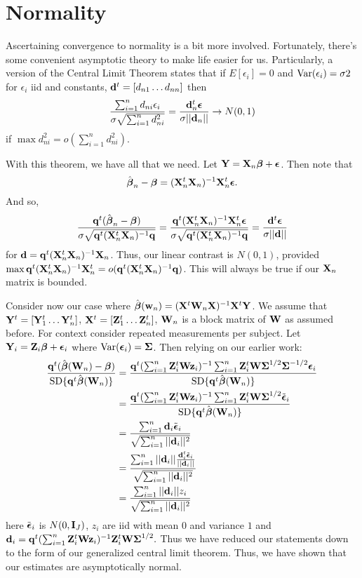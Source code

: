 \section{Normality}
Ascertaining convergence to normality is a bit more involved.
Fortunately, there's some convenient asymptotic theory to 
make life easier for us. Particularly, a version of the
Central Limit Theorem states that if $E[\epsilon_i] = 0$ and
$\mbox{Var}(\epsilon_i) = \sigma2$ for $\epsilon_i$ iid and constants, $\mathbf{d}^t
= [d_{n1} \ldots d_{nn}]$ then
$$
\frac{\sum_{i=1}^n d_{ni} \epsilon_i}{\sigma \sqrt{\sum_{i=1}^n d_{ni}^2 }}
=  \frac{ \mathbf{d}_n ^ t \boldsymbol{\epsilon} }{\sigma|| \mathbf{d}_n ||} \rightarrow N(0, 1)
$$
if $\max d_{ni}^2 = o(\sum_{i=1}^n d_{ni}^2)$.

With this theorem, we have all that we need. Let
$\mathbf{Y} = \mathbf{X}_n \boldsymbol{\beta} + \boldsymbol{\epsilon}$. Then note that
$$
\hat {\boldsymbol{\beta}}_n  - \boldsymbol{\beta} 
= (\mathbf{X}_n^t \mathbf{X}_n)^{-1} \mathbf{X}_n^t \boldsymbol{\epsilon}. 
$$
And so,
$$
\frac{\bq^t(\hat \bbeta_n  - \bbeta)}{\sigma \sqrt{\bq^t (\bX_n^t \bX_n)^{-1} \bq}}=
\frac{\bq^t (\bX_n^t \bX_n)^{-1} \bX_n^t \beps}%
{\sigma \sqrt{\bq^t (\bX_n^t \bX_n)^{-1} \bq}}
= \frac{\bd^t \beps}{\sigma ||\bd||}
$$
for $\mathbf{d} = \mathbf{q}^t (\mathbf{X}_n^t \mathbf{X}_n)^{-1}\mathbf{X}_n$. Thus, our linear contrast
is $N(0,1)$, provided $\max \mathbf{q}^t (\mathbf{X}_n^t \mathbf{X}_n)^{-1}\mathbf{X}_n^t = o(\mathbf{q}^t (\mathbf{X}_n^t \mathbf{X}_n)^{-1} \mathbf{q})$.
This will always be true if our $\mathbf{X}_n$ matrix is bounded.

Consider now our case where $\hat {\boldsymbol{\beta}} (\mathbf{w}_n) = (\mathbf{X}^t \mathbf{W}_n \mathbf{X})^{-1} \mathbf{X}^t \mathbf{Y}$. We
assume that $\mathbf{Y}^t = [\mathbf{Y}_1^t \ldots \mathbf{Y}_n^t]$, $\mathbf{X}^t = [\mathbf{Z}_1^t \ldots \mathbf{Z}_n^t]$,
$\mathbf{W}_n$ is a block matrix of $\mathbf{W}$ as assumed before. For context consider repeated measurements
per subject. Let $\mathbf{Y}_i = \mathbf{Z}_i \boldsymbol{\beta} + \boldsymbol{\epsilon}_i$ where $\mbox{Var}(\boldsymbol{\epsilon}_i) = \boldsymbol{\Sigma}$. Then
relying on our earlier work:
\begin{align*}
\frac{\bq^t (\hat \bbeta(\bW_n) - \bbeta)}{\mbox{SD}\{\bq^t \hat \bbeta(\bW_n)\}}
& =  \frac{\bq^t(\sum_{i=1}^n \bZ_i^t \bW \bz_i)^{-1}\sum_{i=1}^n \bZ_i^t \bW \bSigma^{1/2} \bSigma^{-1/2} \beps_i}%
{\mbox{SD}\{\bq^t \hat \bbeta(\bW_n)\}} \\
& = \frac{\bq^t(\sum_{i=1}^n \bZ_i^t \bW \bz_i)^{-1}\sum_{i=1}^n \bZ_i^t \bW \bSigma^{1/2} \tilde \beps_i}%
{\mbox{SD}\{\bq^t \hat \bbeta(\bW_n)\}} \\
& = \frac{\sum_{i=1}^n \bd_{i} \tilde \beps_i}{\sqrt{\sum_{i=1}^n ||\bd_i ||^2}} \\
& = \frac{\sum_{i=1}^n ||\bd_i|| \frac{\bd_i^t \tilde \beps_i}{||\bd_i||}}{\sqrt{\sum_{i=1}^n ||\bd_i ||^2}} \\
& = \frac{\sum_{i=1}^n ||\bd_i|| z_i}{\sqrt{\sum_{i=1}^n ||\bd_i ||^2}} 
\end{align*}
here $\tilde {\boldsymbol{\epsilon}}_i$ is $N(0,\mathbf{I}_{J})$, $z_i$ are iid with mean $0$ and variance $1$ and
$
\mathbf{d}_i = \mathbf{q}^t(\sum_{i=1}^n \mathbf{Z}_i^t \mathbf{W} \mathbf{z}_i)^{-1} \mathbf{Z}_i^t \mathbf{W} \boldsymbol{\Sigma}^{1/2}.
$
Thus we have reduced our statements down to the form of our generalized central limit theorem. 
Thus, we have shown that our estimates are asymptotically normal.

